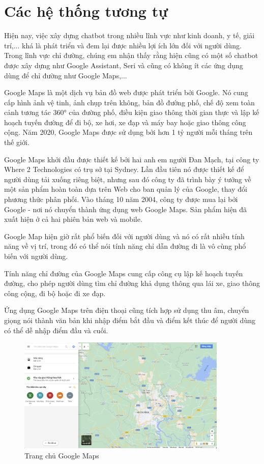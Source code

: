 \section{Các hệ thống tương tự}

Hiện nay, việc xây dựng chatbot trong nhiều lĩnh vực như kinh doanh, y tế, giải trí,... khá là phát triển và đem lại được nhiều lợi ích lớn đối với người dùng. Trong lĩnh vực chỉ đường, chúng em nhận thấy rằng hiện cũng có một số chatbot được xây dựng như Google Assistant, Seri và cũng có không ít các ứng dụng dùng để chỉ đường như Google Maps\cite{ggmaps},...

Google Maps là một dịch vụ bản đồ web được phát triển bởi Google. Nó cung cấp hình ảnh vệ tinh, ảnh chụp trên không, bản đồ đường phố, chế độ xem toàn cảnh tương tác 360° của đường phố, điều kiện giao thông thời gian thực và lập kế hoạch tuyến đường để đi bộ, xe hơi, xe đạp và máy bay hoặc giao thông công cộng. Năm 2020, Google Maps được sử dụng bởi hơn 1 tỷ người mỗi tháng trên thế giới\cite{wiki-ggmaps}.

Google Maps khởi đầu được thiết kế bởi hai anh em người Đan Mạch, tại công ty Where 2 Technologies có trụ sở tại Sydney. Lần đầu tiên nó được thiết kế để người dùng tải xuống riêng biệt, nhưng sau đó công ty đã trình bày ý tưởng về một sản phẩm hoàn toàn dựa trên Web cho ban quản lý của Google, thay đổi phương thức phân phối. Vào tháng 10 năm 2004, công ty được mua lại bởi Google - nơi nó chuyển thành ứng dụng web Google Maps. Sản phẩm hiện đã xuất hiện ở cả hai phiên bản web và mobile.

Google Map hiện giờ rất phổ biến đối với người dùng và nó có rất nhiều tính năng về vị trí, trong đó có thể nói tính năng chỉ dẫn đường đi là vô cùng phổ biến với người dùng.

Tính năng chỉ đường của Google Maps cung cấp công cụ lập kế hoạch tuyến đường, cho phép người dùng tìm chỉ đường khả dụng thông qua lái xe, giao thông công cộng, đi bộ hoặc đi xe đạp.

Ứng dụng Google Maps trên điện thoại cũng tích hợp sử dụng thu âm, chuyển giọng nói thành văn bản khi nhập điểm bắt đầu và điểm kết thúc để người dùng có thể dễ nhập điểm đầu và cuối.

\begin{figure}[H]
    \centering
    \includegraphics[width=10cm]{images/HomePage-GoogleMaps.png}
    \caption{Trang chủ Google Maps}
    \label{fig:homepage-ggmaps}
\end{figure}

